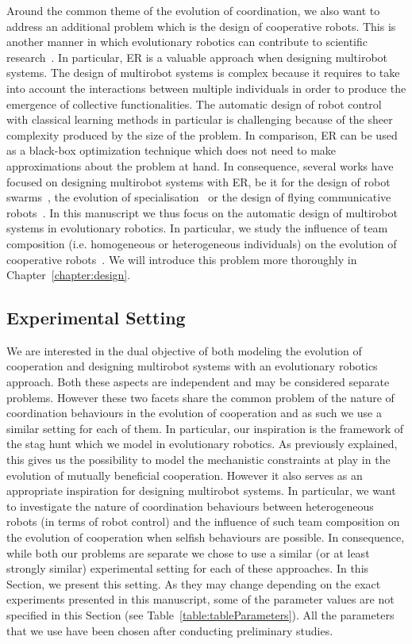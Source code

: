     Around the common theme of the evolution of coordination, we also want to address an additional problem which is the design of cooperative robots. This is another manner in which evolutionary robotics can contribute to scientific research~\parencite{Trianni2014b, Doncieux2015a}. In particular, ER is a valuable approach when designing multirobot systems. The design of multirobot systems is complex because it requires to take into account the interactions between multiple individuals in order to produce the emergence of collective functionalities. The automatic design of robot control with classical learning methods in particular is challenging because of the sheer complexity produced by the size of the problem. In comparison, ER can be used as a black-box optimization technique which does not need to make approximations about the problem at hand. In consequence, several works have focused on designing multirobot systems with ER, be it for the design of robot swarms~\parencite{Baldassarre2007}, the evolution of specialisation~\parencite{Ferrante2015} or the design of flying communicative robots~\parencite{Hauert2014}. In this manuscript we thus focus on the automatic design of multirobot systems in evolutionary robotics. In particular, we study the influence of team composition (i.e. homogeneous or heterogeneous individuals) on the evolution of cooperative robots~\parencite{Waibel2009}. We will introduce this problem more thoroughly in Chapter~\ref{chapter:design}.


  \subsection{Experimental Setting}

    We are interested in the dual objective of both modeling the evolution of cooperation and designing multirobot systems with an evolutionary robotics approach. Both these aspects are independent and may be considered separate problems. However these two facets share the common problem of the nature of coordination behaviours in the evolution of cooperation and as such we use a similar setting for each of them. In particular, our inspiration is the framework of the stag hunt which we model in evolutionary robotics. As previously explained, this gives us the possibility to model the mechanistic constraints at play in the evolution of mutually beneficial cooperation. However it also serves as an appropriate inspiration for designing multirobot systems. In particular, we want to investigate the nature of coordination behaviours between heterogeneous robots (in terms of robot control) and the influence of such team composition on the evolution of cooperation when selfish behaviours are possible. In consequence, while both our problems are separate we chose to use a similar (or at least strongly similar) experimental setting for each of these approaches. In this Section, we present this setting. As they may change depending on the exact experiments presented in this manuscript, some of the parameter values are not specified in this Section (see Table~\ref{table:tableParameters}). All the parameters that we use have been chosen after conducting preliminary studies.

